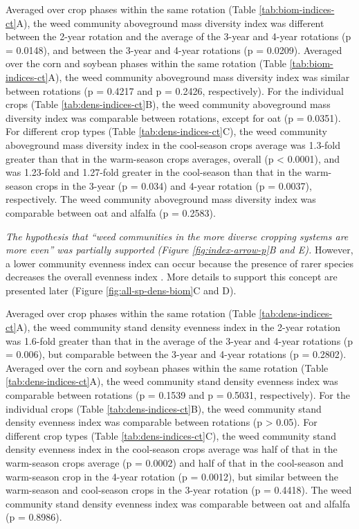 \documentclass[
]{article}
\begin{document}
Averaged over crop phases within the same rotation (Table \ref{tab:biom-indices-ct}A), the weed community aboveground mass diversity index was different between the 2-year rotation and the average of the 3-year and 4-year rotations (p = 0.0148), and between the 3-year and 4-year rotations (p = 0.0209). Averaged over the corn and soybean phases within the same rotation (Table \ref{tab:biom-indices-ct}A), the weed community aboveground mass diversity index was similar between rotations (p = 0.4217 and p = 0.2426, respectively). For the individual crops (Table \ref{tab:dens-indices-ct}B), the weed community aboveground mass diversity index was comparable between rotations, except for oat (p = 0.0351). For different crop types (Table \ref{tab:dens-indices-ct}C), the weed community aboveground mass diversity index in the cool-season crops average was 1.3-fold greater than that in the warm-season crops averages, overall (p \textless{} 0.0001), and was 1.23-fold and 1.27-fold greater in the cool-season than that in the warm-season crops in the 3-year (p = 0.034) and 4-year rotation (p = 0.0037), respectively. The weed community aboveground mass diversity index was comparable between oat and alfalfa (p = 0.2583).

\emph{The hypothesis that ``weed communities in the more diverse cropping systems are more even'' was partially supported (Figure \ref{fig:index-arrow-p}B and E).} However, a lower community evenness index can occur because the presence of rarer species decreases the overall evenness index \citep{stirlingEmpiricalRelationshipsSpecies2001}. More details to support this concept are presented later (Figure \ref{fig:all-sp-dens-biom}C and D).

Averaged over crop phases within the same rotation (Table \ref{tab:dens-indices-ct}A), the weed community stand density evenness index in the 2-year rotation was 1.6-fold greater than that in the average of the 3-year and 4-year rotations (p = 0.006), but comparable between the 3-year and 4-year rotations (p = 0.2802). Averaged over the corn and soybean phases within the same rotation (Table \ref{tab:dens-indices-ct}A), the weed community stand density evenness index was comparable between rotations (p = 0.1539 and p = 0.5031, respectively). For the individual crops (Table \ref{tab:dens-indices-ct}B), the weed community stand density evenness index was comparable between rotations (p \textgreater{} 0.05). For different crop types (Table \ref{tab:dens-indices-ct}C), the weed community stand density evenness index in the cool-season crops average was half of that in the warm-season crops average (p = 0.0002) and half of that in the cool-season and warm-season crop in the 4-year rotation (p = 0.0012), but similar between the warm-season and cool-season crops in the 3-year rotation (p = 0.4418). The weed community stand density evenness index was comparable between oat and alfalfa (p = 0.8986).
\end{document}
